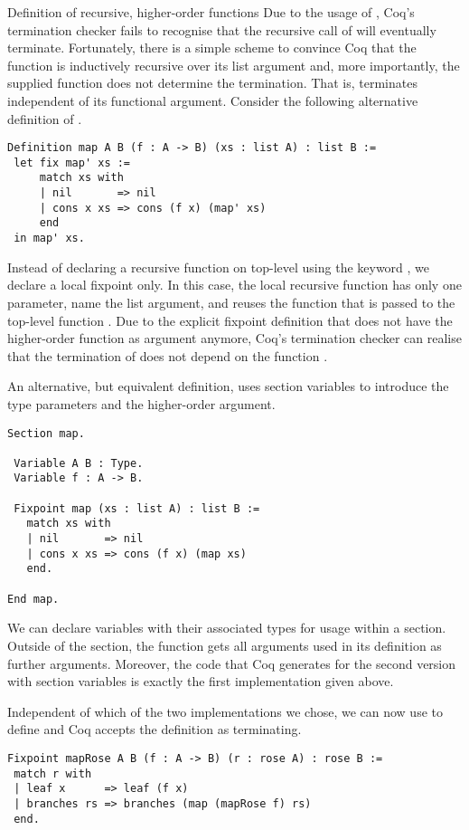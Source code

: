 \begin{excursus}{Definition of recursive, higher\--order functions}
Due to the usage of , Coq's termination checker fails to recognise that the recursive call of  will eventually terminate.
Fortunately, there is a simple scheme to convince Coq that the function  is inductively recursive over its list argument and, more importantly, the supplied function does not determine the termination.
That is,  terminates independent of its functional argument.
Consider the following alternative definition of .

\begin{verbatim}
Definition map A B (f : A -> B) (xs : list A) : list B :=
 let fix map' xs :=
     match xs with
     | nil       => nil
     | cons x xs => cons (f x) (map' xs)
     end
 in map' xs.
\end{verbatim}

Instead of declaring a recursive function on top\--level using the keyword , we declare a local fixpoint only.
In this case, the local recursive function  has only one parameter, name the list argument, and reuses the function  that is passed to the top\--level function .
Due to the explicit fixpoint definition that does not have the higher\--order function as argument anymore, Coq's termination checker can realise that the termination of  does not depend on the function .

An alternative, but equivalent definition, uses section variables to introduce the type parameters and the higher\--order argument.

\begin{verbatim}
Section map.

 Variable A B : Type.
 Variable f : A -> B.

 Fixpoint map (xs : list A) : list B :=
   match xs with
   | nil       => nil
   | cons x xs => cons (f x) (map xs)
   end.

End map.
\end{verbatim}

We can declare variables with their associated types for usage within a section.
Outside of the section, the function  gets all arguments used in its definition as further arguments.
Moreover, the code that Coq generates for the second version with section variables is exactly the first implementation given above.

Independent of which of the two implementations we chose, we can now use  to define  and Coq accepts the definition as terminating.

\begin{verbatim}
Fixpoint mapRose A B (f : A -> B) (r : rose A) : rose B :=
 match r with
 | leaf x      => leaf (f x)
 | branches rs => branches (map (mapRose f) rs)
 end.
\end{verbatim}
\end{excursus}


